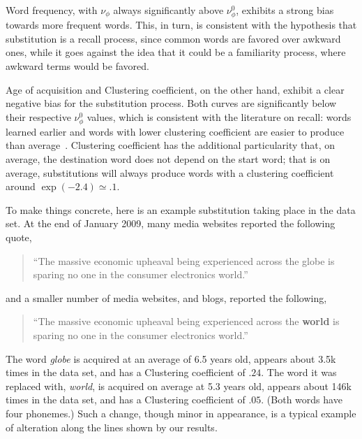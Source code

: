 Word frequency, with $\nu_{\phi}$ always significantly above $\nu_{\phi}^0$, exhibits a strong bias towards more frequent words. This, in turn, is consistent with the hypothesis that substitution is a recall process, since common words are favored over awkward ones, while it goes against the idea that it could be a familiarity process, where awkward terms would be favored.


Age of acquisition and Clustering coefficient, on the other hand, exhibit a clear negative bias for the substitution process. Both curves are significantly below their respective $\nu_{\phi}^0$ values, which is consistent with the literature on recall: words learned earlier and words with lower clustering coefficient are easier to produce than average~\citep{nelson2013activation,Zevin02}.
Clustering coefficient has the additional particularity that, on average, the destination word does not depend on the start word; that is on average, substitutions will always produce words with a clustering coefficient around $\exp(-2.4) \simeq .1$.

To make things concrete, here is an example substitution taking place in the data set.
At the end of January 2009, many media websites reported the following quote,

\begin{quote}
    ``The massive economic upheaval being experienced across the globe is sparing no one in the consumer electronics world.''
\end{quote}
and a smaller number of media websites, and blogs, reported the following,
\begin{quote}
    ``The massive economic upheaval being experienced across the \textbf{world} is sparing no one in the consumer electronics world.''
\end{quote}
The word \emph{globe} is acquired at an average of 6.5 years old, appears about 3.5k times in the data set, and has a Clustering coefficient of $.24$.
The word it was replaced with, \emph{world}, is acquired on average at 5.3 years old, appears about 146k times in the data set, and has a Clustering coefficient of $.05$. (Both words have four phonemes.)
Such a change, though minor in appearance, is a typical example of alteration along the lines shown by our results.

